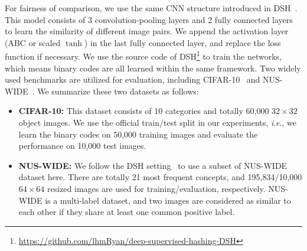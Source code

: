 \documentclass[runningheads]{llncs}
\newcommand{\ie}{\textit{i}.\textit{e}.}
\begin{document}
For fairness of comparison, we use the same CNN structure introduced in DSH~\cite{Liu16CVPR_r12}. This model consists of 3 convolution-pooling layers and 2 fully connected layers to learn the similarity of different image pairs. We append the activation layer (ABC or scaled $\tanh$) in the last fully connected layer, and replace the loss function if necessary. We use the source code of DSH\footnote{\url{https://github.com/lhmRyan/deep-supervised-hashing-DSH}} to train the networks, which means binary codes are all learned within the same framework. Two widely used benchmarks are utilized for evaluation, including CIFAR-10~\cite{cifar_10} and NUS-WIDE~\cite{NUS_WIDE}. We summarize these two datasets as follows:

\begin{itemize}
	\item \textbf{CIFAR-10: }This dataset consists of 10 categories and totally 60,000 $32\times 32$ object images. We use the official train/test split in our experiments, \ie, we learn the binary codes on 50,000 training images and evaluate the performance on 10,000 test images. 
	\item \textbf{NUS-WIDE: }We follow the DSH setting~\cite{Liu16CVPR_r12} to use a subset of NUS-WIDE dataset here. There are totally 21 most frequent concepts, and 195,834/10,000 $64\times 64$ resized images are used for training/evaluation, respectively. NUS-WIDE is a multi-label dataset, and two images are considered as similar to each other if they share at least one common positive label.
\end{itemize}
\end{document}
